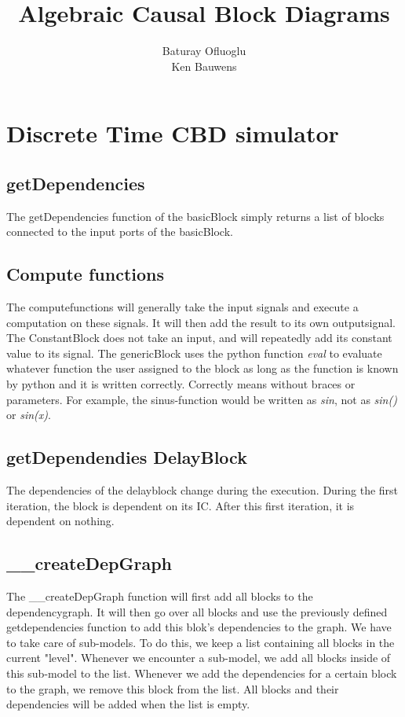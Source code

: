 \documentclass{article}
\title{Algebraic Causal Block Diagrams}
\author{Baturay Ofluoglu\\Ken Bauwens}
\begin{document}
\maketitle
\pagebreak
\section{Discrete Time CBD simulator}
\subsection{getDependencies}
The getDependencies function of the basicBlock simply returns a list of blocks connected to the input ports of the basicBlock.
\subsection{Compute functions}
The computefunctions will generally take the input signals and execute a computation on these signals. It will then add the result to its own outputsignal. The ConstantBlock does not take an input, and will repeatedly add its constant value to its signal. The genericBlock uses the python function \textit{eval} to evaluate whatever function the user assigned to the block as long as the function is known by python and it is written correctly. Correctly means without braces or parameters. For example, the sinus-function would be written as \textit{sin}, not as \textit{sin()} or \textit{sin(x)}.
\subsection{getDependendies DelayBlock}
The dependencies of the delayblock change during the execution. During the first iteration, the block is dependent on its IC. After this first iteration, it is dependent on nothing. 
\subsection{\_\_createDepGraph}
The \_\_createDepGraph function will first add all blocks to the dependencygraph. It will then go over all blocks and use the previously defined getdependencies function to add this blok's dependencies to the graph. We have to take care of sub-models. To do this, we keep a list containing all blocks in the current "level". Whenever we encounter a sub-model, we add all blocks inside of this sub-model to the list. Whenever we add the dependencies for a certain block to the graph, we remove this block from the list. All blocks and their dependencies will be added when the list is empty.
\end{document}
